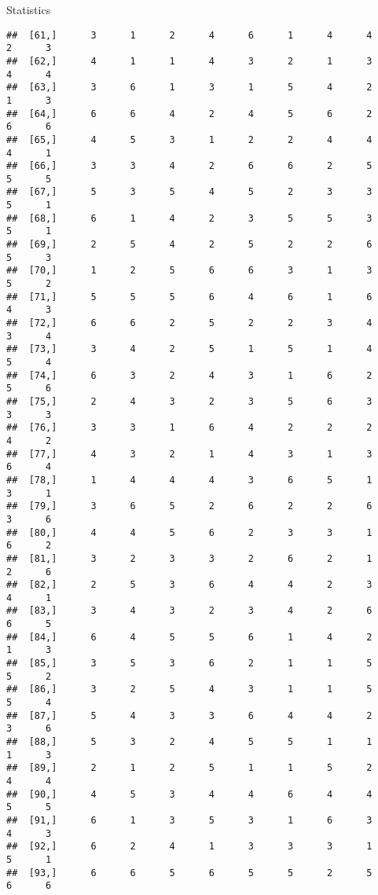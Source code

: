 \documentclass[
  ignorenonframetext,
]{beamer}
\begin{document}
\begin{frame}[fragile]{Statistics}
\begin{verbatim}
##  [61,]      3      1      2      4      6      1      4      4      2      3
##  [62,]      4      1      1      4      3      2      1      3      4      4
##  [63,]      3      6      1      3      1      5      4      2      1      3
##  [64,]      6      6      4      2      4      5      6      2      6      6
##  [65,]      4      5      3      1      2      2      4      4      4      1
##  [66,]      3      3      4      2      6      6      2      5      5      5
##  [67,]      5      3      5      4      5      2      3      3      5      1
##  [68,]      6      1      4      2      3      5      5      3      5      1
##  [69,]      2      5      4      2      5      2      2      6      5      3
##  [70,]      1      2      5      6      6      3      1      3      5      2
##  [71,]      5      5      5      6      4      6      1      6      4      3
##  [72,]      6      6      2      5      2      2      3      4      3      4
##  [73,]      3      4      2      5      1      5      1      4      5      4
##  [74,]      6      3      2      4      3      1      6      2      5      6
##  [75,]      2      4      3      2      3      5      6      3      3      3
##  [76,]      3      3      1      6      4      2      2      2      4      2
##  [77,]      4      3      2      1      4      3      1      3      6      4
##  [78,]      1      4      4      4      3      6      5      1      3      1
##  [79,]      3      6      5      2      6      2      2      6      3      6
##  [80,]      4      4      5      6      2      3      3      1      6      2
##  [81,]      3      2      3      3      2      6      2      1      2      6
##  [82,]      2      5      3      6      4      4      2      3      4      1
##  [83,]      3      4      3      2      3      4      2      6      6      5
##  [84,]      6      4      5      5      6      1      4      2      1      3
##  [85,]      3      5      3      6      2      1      1      5      5      2
##  [86,]      3      2      5      4      3      1      1      5      5      4
##  [87,]      5      4      3      3      6      4      4      2      3      6
##  [88,]      5      3      2      4      5      5      1      1      1      3
##  [89,]      2      1      2      5      1      1      5      2      4      4
##  [90,]      4      5      3      4      4      6      4      4      5      5
##  [91,]      6      1      3      5      3      1      6      3      4      3
##  [92,]      6      2      4      1      3      3      3      1      5      1
##  [93,]      6      6      5      6      5      5      2      5      6      6

\end{verbatim}
\end{frame}
\end{document}
